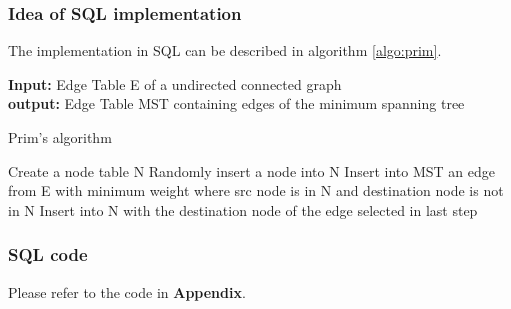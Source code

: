 \subsubsection{Idea of SQL implementation}
The implementation in SQL can be described in algorithm \ref{algo:prim}.
 
\begin{algorithm}
{\bf Input:} Edge Table E of a undirected connected graph \\
{\bf output:} Edge Table MST containing edges of the minimum spanning tree
\begin{algorithmic}
\caption{Prim's algorithm}
\STATE Create a node table N
\STATE Randomly insert a node into N
	\STATE Insert into MST an edge from E with minimum weight where src node is in N and destination node is not in N
	\STATE Insert into N with the destination node of the edge selected in last step
\ENDFOR
\end{algorithmic}
\label{algo:prim}
\end{algorithm}

\subsubsection{SQL code}
Please refer to the code in {\bf Appendix}.



